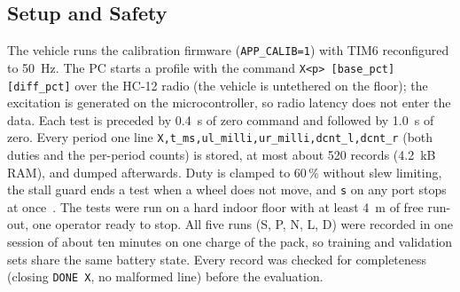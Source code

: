 \documentclass[conference]{IEEEtran}\newcommand{\haveieee}{}%
\begin{document}
\subsection{Setup and Safety}
The vehicle runs the calibration firmware (\texttt{APP\_CALIB=1}) with TIM6 reconfigured to 50~Hz. The PC starts a profile with the command \texttt{X<p> [base\_pct] [diff\_pct]} over the HC-12 radio (the vehicle is untethered on the floor); the excitation is generated on the microcontroller, so radio latency does not enter the data. Each test is preceded by 0.4~s of zero command and followed by 1.0~s of zero. Every period one line \texttt{X,t\_ms,ul\_milli,ur\_milli,dcnt\_l,dcnt\_r} (both duties and the per-period counts) is stored, at most about 520 records (4.2~kB RAM), and dumped afterwards. Duty is clamped to 60\,\% without slew limiting, the stall guard ends a test when a wheel does not move, and \texttt{s} on any port stops at once~\cite{fwspec}. The tests were run on a hard indoor floor with at least 4~m of free run-out, one operator ready to stop. All five runs (S, P, N, L, D) were recorded in one session of about ten minutes on one charge of the pack, so training and validation sets share the same battery state. Every record was checked for completeness (closing \texttt{DONE X}, no malformed line) before the evaluation.
\end{document}
